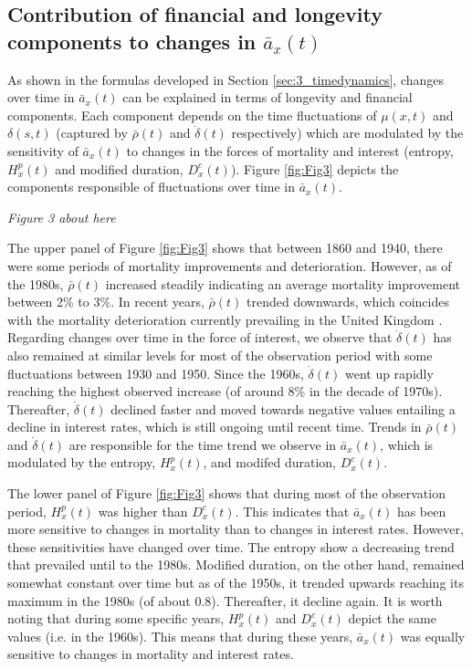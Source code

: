 \documentclass[12pt]{article}
\begin{document}
\subsection{Contribution of financial and longevity components to changes in $\bar{a}_x(t)$}

As shown in the formulas developed in Section \ref{sec:3_timedynamics}, changes over time in $\bar{a}_x(t)$ can be explained in terms of longevity and financial components. Each component depends on the time fluctuations of $\mu(x,t)$ and $\delta(s,t)$ (captured by $\bar{\rho}(t)$ and $\dot{\delta}(t)$ respectively) which are modulated by the sensitivity of $\bar{a}_x(t)$ to changes in the forces of mortality and interest (entropy, ${H}^{p}_x(t)$ and modified duration, ${D}^{c}_x(t)$). Figure \ref{fig:Fig3} depicts the components responsible of fluctuations over time in $\bar{a}_x(t)$.

  \begin{center}
	\textit{Figure 3 about here}
\end{center}


The upper panel of Figure \ref{fig:Fig3} shows that between 1860 and 1940, there were some periods of mortality improvements and deterioration. However, as of the 1980s, $\bar{\rho}(t)$ increased steadily indicating an average mortality improvement between 2\% to 3\%. In recent years, $\bar{\rho}(t)$ trended downwards, which coincides with the mortality deterioration currently prevailing in the United Kingdom \citep{djeundje2022slowdown}. Regarding changes over time in the force of interest, we observe that $\dot{\delta}(t)$ has also remained at similar levels for most of the observation period with some fluctuations between 1930 and 1950. Since the 1960s, $\dot{\delta}(t)$ went up rapidly reaching the highest observed increase (of around 8\% in the decade of 1970s). Thereafter, $\dot{\delta}(t)$ declined faster and moved towards negative values entailing a decline in interest rates, which is still ongoing until recent time. Trends in $\bar{\rho}(t)$ and $\dot{\delta}(t)$ are responsible for the time trend we observe in $\bar{a}_x(t)$, which is modulated by the entropy, ${H}^{p}_x(t)$, and modifed duration, ${D}^{c}_x(t)$.


The lower panel of Figure \ref{fig:Fig3} shows that during most of the observation period, ${H}^{p}_x(t)$ was higher than ${D}^{c}_x(t)$. This indicates that $\bar{a}_x(t)$ has been more sensitive to changes in mortality than to changes in interest rates. However, these sensitivities have changed over time. The entropy show a decreasing trend that prevailed until to the 1980s. Modified duration, on the other hand, remained somewhat constant over time but as of the 1950s, it trended upwards reaching its maximum in the 1980s (of about 0.8). Thereafter, it decline again. It is worth noting that during some specific years, ${H}^{p}_x(t)$ and ${D}^{c}_x(t)$ depict the same values (i.e. in the 1960s). This means that during these years, $\bar{a}_x(t)$ was equally sensitive to changes in mortality and interest rates.
\end{document}
